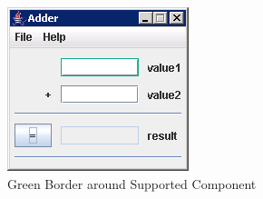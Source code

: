 \begin{figure} [h]
\begin{center}
\includegraphics{Tasks/Objectmapping/PS/greenborders}
\caption{Green Border around Supported Component}
\label{greenborders}
\end{center}
\end{figure}


